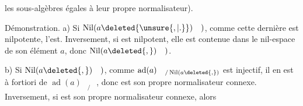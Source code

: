 
les sous-algèbres égales à leur propre normalisateur).

Démonstration. a) Si \hspace{1.5em}$\operatorname{Nil}(a\deleted{\unsure{,|.}})\quad)$, comme cette dernière est nilpotente,
\hspace{1em}l'est. Inversement, si \hspace{1.1em} est nilpotent, elle est contenue dans
le nil-espace de son élément $a$, donc \hspace{2em}$\operatorname{Nil}(a\deleted{,})\quad)$.

b) Si \hspace{2em}$\operatorname{Nil}(a\deleted{,})\quad)$, comme $\operatorname{ad}(a)_{\quad/\operatorname{Nil}(a\deleted{,})}$ est injectif, il en
est à fortiori de $\operatorname{ad}(a)_{\quad/\quad}$, donc \hspace{1.5em} est son propre normalisateur
connexe. Inversement, si \hspace{1em} est son propre normalisateur connexe, alors

